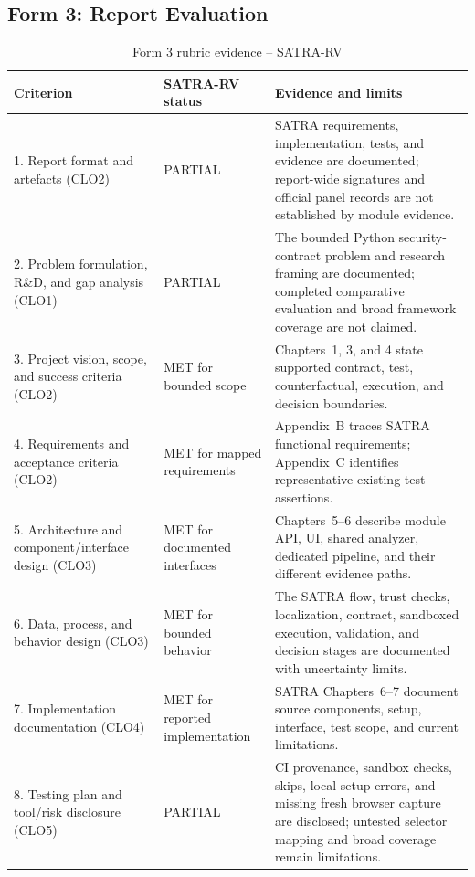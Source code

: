 \clearpage
\subsection{Form 3: Report Evaluation}
\small
\begin{longtable}{p{}p{}p{}}
\caption{Form 3 rubric evidence -- SATRA-RV}\\
\toprule
\textbf{Criterion} & \textbf{SATRA-RV status} & \textbf{Evidence and limits}\\
\midrule
1. Report format and artefacts (CLO2) & PARTIAL & SATRA requirements, implementation, tests, and evidence are documented; report-wide signatures and official panel records are not established by module evidence.\\
2. Problem formulation, R\&D, and gap analysis (CLO1) & PARTIAL & The bounded Python security-contract problem and research framing are documented; completed comparative evaluation and broad framework coverage are not claimed.\\
3. Project vision, scope, and success criteria (CLO2) & MET for bounded scope & Chapters~1, 3, and 4 state supported contract, test, counterfactual, execution, and decision boundaries.\\
4. Requirements and acceptance criteria (CLO2) & MET for mapped requirements & Appendix~B traces SATRA functional requirements; Appendix~C identifies representative existing test assertions.\\
5. Architecture and component/interface design (CLO3) & MET for documented interfaces & Chapters~5--6 describe module API, UI, shared analyzer, dedicated pipeline, and their different evidence paths.\\
6. Data, process, and behavior design (CLO3) & MET for bounded behavior & The SATRA flow, trust checks, localization, contract, sandboxed execution, validation, and decision stages are documented with uncertainty limits.\\
7. Implementation documentation (CLO4) & MET for reported implementation & SATRA Chapters~6--7 document source components, setup, interface, test scope, and current limitations.\\
8. Testing plan and tool/risk disclosure (CLO5) & PARTIAL & CI provenance, sandbox checks, skips, local setup errors, and missing fresh browser capture are disclosed; untested selector mapping and broad coverage remain limitations.\\
\bottomrule
\end{longtable}
\normalsize

